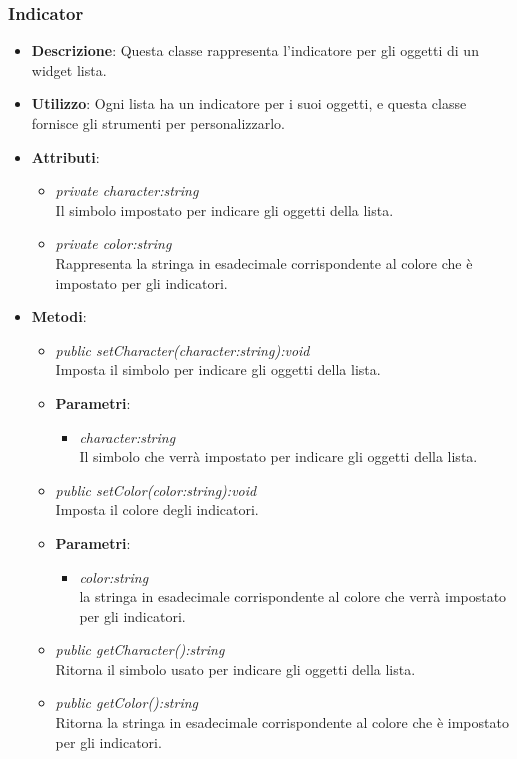 \subsubsection{Indicator}
\begin{itemize}
\item \textbf{Descrizione}: Questa classe rappresenta l'indicatore per gli oggetti di un widget lista.
\item \textbf{Utilizzo}: Ogni lista ha un indicatore per i suoi oggetti, e questa classe fornisce gli strumenti per personalizzarlo.
\item \textbf{Attributi}:
	\begin{itemize}
	\item \textit{private character:string}\\
	Il simbolo impostato per indicare gli oggetti della lista.
	\item \textit{private color:string}\\
	Rappresenta la stringa in esadecimale corrispondente al colore che è impostato per gli indicatori.
	\end{itemize}
\item \textbf{Metodi}:
	\begin{itemize}
	\item \textit{public setCharacter(character:string):void}\\
	Imposta il simbolo per indicare gli oggetti della lista.
		\item{\textbf{Parametri}: \begin{itemize}
		\item \textit{character:string}\\
		Il simbolo che verrà impostato per indicare gli oggetti della lista.
		\end{itemize}}
	\item \textit{public setColor(color:string):void}\\
	Imposta il colore degli indicatori.
		\item{\textbf{Parametri}: \begin{itemize}
		\item \textit{color:string}\\
		la stringa in esadecimale corrispondente al colore che verrà impostato per gli indicatori.
		\end{itemize}}
	\item \textit{public getCharacter():string}\\
	Ritorna il simbolo usato per indicare gli oggetti della lista.
	\item \textit{public getColor():string}\\
	Ritorna la stringa in esadecimale corrispondente al colore che è impostato per gli indicatori.
	\end{itemize}
\end{itemize}

